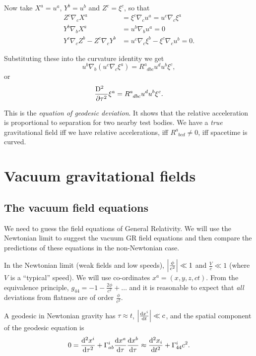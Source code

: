 \documentclass{notes}
\newcommand{\del}{\nabla}
\begin{document}
Now take $X^a = u^a$, $Y^b = u^b$ and $Z^c = \xi^c$, so that
\begin{align*}
Z^c \del_c X^a &= \xi^c \del_c u^a = u^c \del_c \xi^a \\
Y^b \del_b X^a &= u^b \del_b u^a = 0 \\
Y^c \del_c Z^b - Z^c \del_c Y^b &= u^c \del_c \xi^b - \xi^c \del_c u^b
= 0.
\end{align*}

Substituting these into the curvature identity we get
\[
u^b \del_b \left( u^c \del_c \xi^a \right) = R^a_{\phantom{a}dbc} u^d
u^b \xi^c,
\]
or
\begin{equation}\label{eq:geodev}
\frac{\mathrm{D}^2\phantom{\tau}}{\partial \tau^2} \xi^a
= R^a_{\phantom{a}dbc} u^d u^b \xi^c.
\end{equation}

This is the \emph{equation of geodesic deviation}.  It shows that the
relative acceleration is proportional to separation for two nearby
test bodies.  We have a \emph{true} gravitational field iff we have
relative accelerations, iff $R^a_{\phantom{a}bcd} \neq 0$, iff
spacetime is curved.

\chapter{Vacuum gravitational fields}

\section{The vacuum field equations}

We need to guess the field equations of General Relativity.  We will use
the Newtonian limit to suggest the vacuum GR field equations and then
compare the predictions of these equations in the non-Newtonian case.

In the Newtonian limit (weak fields and low speeds), $\left|\tfrac{\phi}{c^2}\right|
\ll 1$ and $\tfrac{V}{c} \ll 1$ (where $V$ is a ``typical'' speed).  We
will use co-ordinates $x^a = (x,y,z,ct)$.  From the equivalence principle,
$g_{44} = -1 - \tfrac{2 \phi}{c^2} + \dots$ and it is reasonable to
expect that \emph{all} deviations from flatness are of order
$\tfrac{\phi}{c^2}$.

A geodesic in Newtonian gravity has $\tau \approx t$,
$\left|\frac{\mathrm{d} x^i}{\mathrm{d} t}\right| \ll c$, and the spatial component of the
geodesic equation is
\[
0 = \frac{\mathrm{d}^2 x^i}{\mathrm{d}\tau^2} + \Gamma^i_{a b} \frac{\mathrm{d} x^a}{\mathrm{d}\tau}
\frac{\mathrm{d} x^b}{\mathrm{d}\tau} \approx \frac{\mathrm{d}^2 x_i}{\mathrm{d} t^2} + \Gamma^i_{44} c^2.
\]
\end{document}
